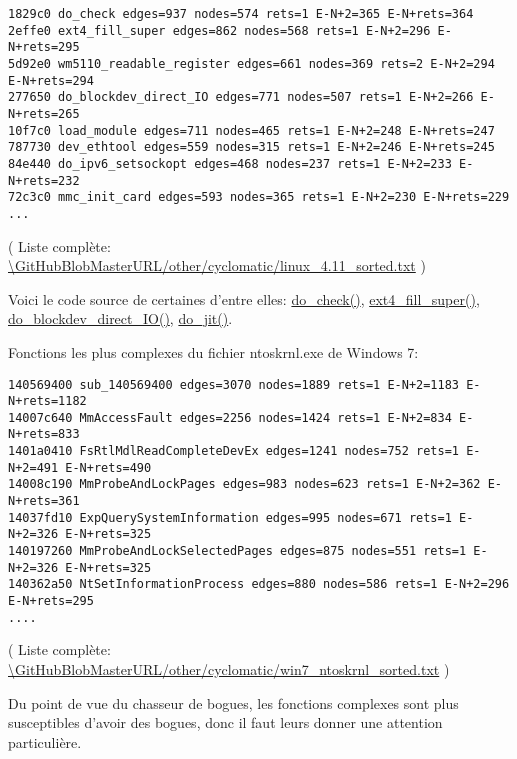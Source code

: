 \begin{lstlisting}
1829c0 do_check edges=937 nodes=574 rets=1 E-N+2=365 E-N+rets=364
2effe0 ext4_fill_super edges=862 nodes=568 rets=1 E-N+2=296 E-N+rets=295
5d92e0 wm5110_readable_register edges=661 nodes=369 rets=2 E-N+2=294 E-N+rets=294
277650 do_blockdev_direct_IO edges=771 nodes=507 rets=1 E-N+2=266 E-N+rets=265
10f7c0 load_module edges=711 nodes=465 rets=1 E-N+2=248 E-N+rets=247
787730 dev_ethtool edges=559 nodes=315 rets=1 E-N+2=246 E-N+rets=245
84e440 do_ipv6_setsockopt edges=468 nodes=237 rets=1 E-N+2=233 E-N+rets=232
72c3c0 mmc_init_card edges=593 nodes=365 rets=1 E-N+2=230 E-N+rets=229
...
\end{lstlisting}
( Liste complète: \url{\GitHubBlobMasterURL/other/cyclomatic/linux_4.11_sorted.txt} )

Voici le code source de certaines d'entre elles:
\href{https://github.com/torvalds/linux/blob/56868a460b83c0f93d339256a81064d89aadae8e/kernel/bpf/verifier.c\#L2811}{do\_check()},
\href{https://github.com/torvalds/linux/blob/0fcc3ab23d7395f58e8ab0834e7913e2e4314a83/fs/ext4/super.c\#L3358}{ext4\_fill\_super()},
\href{https://github.com/torvalds/linux/blob/86292b33d4b79ee03e2f43ea0381ef85f077c760/fs/direct-io.c\#L1107}{do\_blockdev\_direct\_IO()},
\href{https://github.com/torvalds/linux/blob/bf5f89463f5b3109a72ed13ca62b57e90213387d/arch/x86/net/bpf_jit_comp.c\#L351}{do\_jit()}.

Fonctions les plus complexes du fichier ntoskrnl.exe de Windows 7:

\begin{lstlisting}
140569400 sub_140569400 edges=3070 nodes=1889 rets=1 E-N+2=1183 E-N+rets=1182
14007c640 MmAccessFault edges=2256 nodes=1424 rets=1 E-N+2=834 E-N+rets=833
1401a0410 FsRtlMdlReadCompleteDevEx edges=1241 nodes=752 rets=1 E-N+2=491 E-N+rets=490
14008c190 MmProbeAndLockPages edges=983 nodes=623 rets=1 E-N+2=362 E-N+rets=361
14037fd10 ExpQuerySystemInformation edges=995 nodes=671 rets=1 E-N+2=326 E-N+rets=325
140197260 MmProbeAndLockSelectedPages edges=875 nodes=551 rets=1 E-N+2=326 E-N+rets=325
140362a50 NtSetInformationProcess edges=880 nodes=586 rets=1 E-N+2=296 E-N+rets=295
....
\end{lstlisting}

( Liste complète: \url{\GitHubBlobMasterURL/other/cyclomatic/win7_ntoskrnl_sorted.txt} )

Du point de vue du chasseur de bogues, les fonctions complexes sont plus susceptibles
d'avoir des bogues, donc il faut leurs donner une attention particulière.

